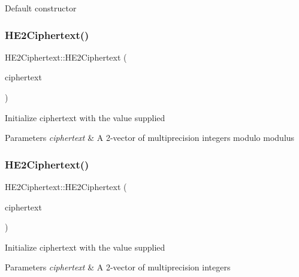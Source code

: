 Default constructor \mbox{\label{classHE2Ciphertext_a8d74aeeaa1af989e7e033f5f35c54550}} 
\subsubsection{\texorpdfstring{H\+E2\+Ciphertext()}{HE2Ciphertext()}\hspace{0.1cm}{\footnotesize\ttfamily [2/4]}}
{\footnotesize\ttfamily H\+E2\+Ciphertext\+::\+H\+E2\+Ciphertext (\begin{DoxyParamCaption}\item[{N\+T\+L\+::vec\+\_\+\+Z\+Z\+\_\+p \&}]{ciphertext }\end{DoxyParamCaption})}

Initialize {\ttfamily ciphertext} with the value supplied 
\begin{DoxyParams}{Parameters}
{\em ciphertext} & A 2-\/vector of multiprecision integers modulo {\ttfamily modulus} \\
\hline
\end{DoxyParams}
\mbox{\label{classHE2Ciphertext_a3c8e2e1657aab1597223ed3b04cdff0e}} 
\subsubsection{\texorpdfstring{H\+E2\+Ciphertext()}{HE2Ciphertext()}\hspace{0.1cm}{\footnotesize\ttfamily [3/4]}}
{\footnotesize\ttfamily H\+E2\+Ciphertext\+::\+H\+E2\+Ciphertext (\begin{DoxyParamCaption}\item[{N\+T\+L\+::vec\+\_\+\+ZZ \&}]{ciphertext }\end{DoxyParamCaption})}

Initialize {\ttfamily ciphertext} with the value supplied 
\begin{DoxyParams}{Parameters}
{\em ciphertext} & A 2-\/vector of multiprecision integers \\
\hline
\end{DoxyParams}
\mbox{\label{classHE2Ciphertext_a0b43eb4010e5dcb24c185b16f96fdf18}} 

